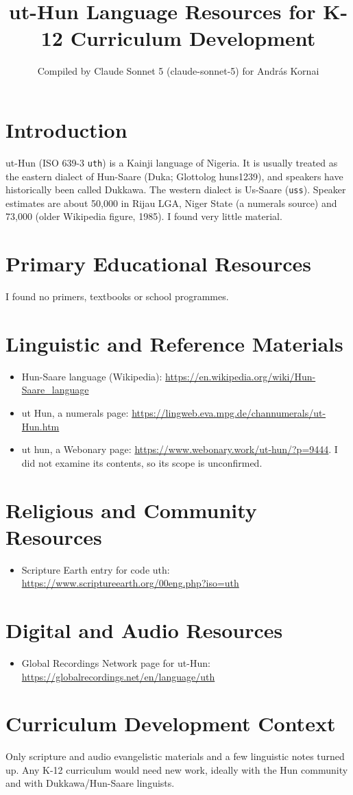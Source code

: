 \documentclass[12pt]{article}
\title{ut-Hun Language Resources for K-12 Curriculum Development}
\author{Compiled by Claude Sonnet 5 (claude-sonnet-5) for Andr\'as Kornai}
\date{}
\begin{document}
\maketitle
\section{Introduction}
ut-Hun (ISO 639-3 \texttt{uth}) is a Kainji language of Nigeria. It is usually treated as the eastern dialect of Hun-Saare (Duka; Glottolog huns1239), and speakers have historically been called Dukkawa. The western dialect is Us-Saare (\texttt{uss}). Speaker estimates are about 50,000 in Rijau LGA, Niger State (a numerals source) and 73,000 (older Wikipedia figure, 1985). I found very little material.
\section{Primary Educational Resources}
I found no primers, textbooks or school programmes.
\section{Linguistic and Reference Materials}
\begin{itemize}
\item Hun-Saare language (Wikipedia): \url{https://en.wikipedia.org/wiki/Hun-Saare_language}
\item ut Hun, a numerals page: \url{https://lingweb.eva.mpg.de/channumerals/ut-Hun.htm}
\item ut hun, a Webonary page: \url{https://www.webonary.work/ut-hun/?p=9444}. I did not examine its contents, so its scope is unconfirmed.
\end{itemize}
\section{Religious and Community Resources}
\begin{itemize}
\item Scripture Earth entry for code uth: \url{https://www.scriptureearth.org/00eng.php?iso=uth}
\end{itemize}
\section{Digital and Audio Resources}
\begin{itemize}
\item Global Recordings Network page for ut-Hun: \url{https://globalrecordings.net/en/language/uth}
\end{itemize}
\section{Curriculum Development Context}
Only scripture and audio evangelistic materials and a few linguistic notes turned up. Any K-12 curriculum would need new work, ideally with the Hun community and with Dukkawa/Hun-Saare linguists.
\end{document}
